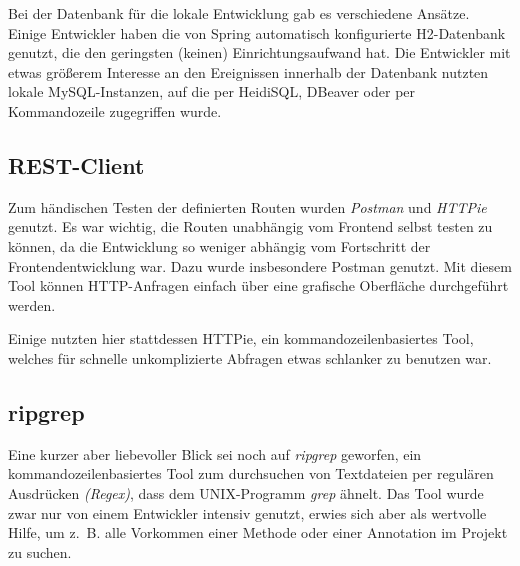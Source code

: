\documentclass[a4paper, 11pt]{article}
\begin{document}
Bei der Datenbank für die lokale Entwicklung gab es verschiedene Ansätze.
Einige Entwickler haben die von Spring automatisch konfigurierte H2-Datenbank
genutzt, die den geringsten (keinen) Einrichtungsaufwand hat. Die Entwickler
mit etwas größerem Interesse an den Ereignissen innerhalb der Datenbank nutzten
lokale MySQL-Instanzen, auf die per HeidiSQL, DBeaver oder per Kommandozeile
zugegriffen wurde.

\subsection{REST-Client}

Zum händischen Testen der definierten Routen wurden \emph{Postman} und
\emph{HTTPie} genutzt. Es war wichtig, die Routen unabhängig vom Frontend selbst
testen zu können, da die Entwicklung so weniger abhängig vom Fortschritt der
Frontendentwicklung war. Dazu wurde insbesondere Postman genutzt. Mit diesem
Tool können HTTP-Anfragen einfach über eine grafische Oberfläche durchgeführt
werden.

Einige nutzten hier stattdessen HTTPie, ein kommandozeilenbasiertes Tool,
welches für schnelle unkomplizierte Abfragen etwas schlanker zu benutzen war.

\subsection{ripgrep}

Eine kurzer aber liebevoller Blick sei noch auf \emph{ripgrep} geworfen, ein
kommandozeilenbasiertes Tool zum durchsuchen von Textdateien per regulären
Ausdrücken \emph{(Regex)}, dass dem UNIX-Programm \emph{grep} ähnelt. Das Tool
wurde zwar nur von einem Entwickler intensiv genutzt, erwies sich aber als
wertvolle Hilfe, um z.~B. alle Vorkommen einer Methode oder einer Annotation im
Projekt zu suchen. 
\end{document}
